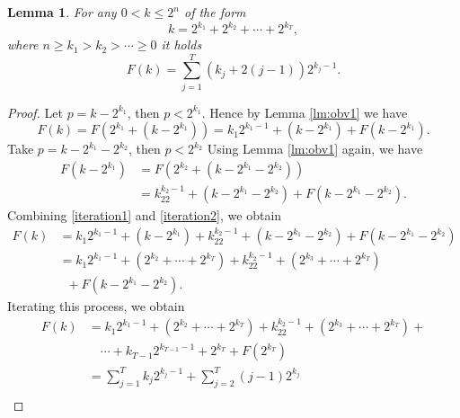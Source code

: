 \documentclass[11pt]{amsart}
\newtheorem{lemma}[theorem]{Lemma}
\theoremstyle{definition}
\renewcommand{\1}{{\mathbbm{1}}}
\begin{document}
\begin{lemma}\label{lem:F_of_bin_rep}
    For any $0< k\leq 2^n$ of the form 
    $$k = 2^{k_1} + 2^{k_2} + \cdots + 2^{k_T},$$ where $n\geq k_1 > k_2 > \cdots \geq 0$ it holds 
    $$F(k) = \sum_{j=1}^{T} (k_j+2(j-1))2^{k_j-1}.$$
\end{lemma}
\begin{proof}
    
    Let $p= k-2^{k_1}$, then $p<2^{k_1}$.
    Hence by Lemma \ref{lm:obv1} we have
    \begin{equation}\label{iteration1}
        F(k) = F(2^{k_1}+(k-2^{k_1})) = k_1 2^{k_1-1}+ (k-2^{k_1}) + F(k-2^{k_1}).
    \end{equation}
    Take $p=k-2^{k_1}-2^{k_2}$, then $p<2^{k_2}$ Using Lemma \ref{lm:obv1} again, we have
    \begin{equation}
    \label{iteration2}
\begin{aligned}
    F(k-2^{k_1})  
    &= F(2^{k_2}+(k - 2^{k_{1}} - 2^{k_2})) \\
    &= k_22^{k_2-1} + (k-2^{k_1}-2^{k_2})  + F(k-2^{k_1}-2^{k_2}).
\end{aligned}
    \end{equation}
    Combining \eqref{iteration1} and \eqref{iteration2}, we obtain
    \begin{align*}
        F(k)&=k_1 2^{k_1-1}+ (k-2^{k_1}) +k_22^{k_2-1} + (k-2^{k_1}-2^{k_2})  + F(k-2^{k_1}-2^{k_2})\\
        &=k_1 2^{k_1-1}+ (2^{k_2} + \cdots + 2^{k_T}) +k_22^{k_2-1} + (2^{k_3} + \cdots + 2^{k_T}) \\
        &\;\;+ F(k-2^{k_1}-2^{k_2}).
    \end{align*}
    Iterating this process, we obtain 
    \begin{align*}
        F(k)
        &=k_1 2^{k_1-1}+ (2^{k_2} + \cdots + 2^{k_T}) +k_22^{k_2-1} + (2^{k_3} + \cdots + 2^{k_T}) +\\
        &\quad\cdots  + k_{T-1}2^{k_{T-1}-1}+2^{k_T} + F(2^{k_T})\\
        &= \sum_{j=1}^{T} k_j 2^{k_j-1} + \sum_{j=2}^{T} (j-1)2^{k_j}\\ %
    \end{align*}
\end{proof}
\end{document}
